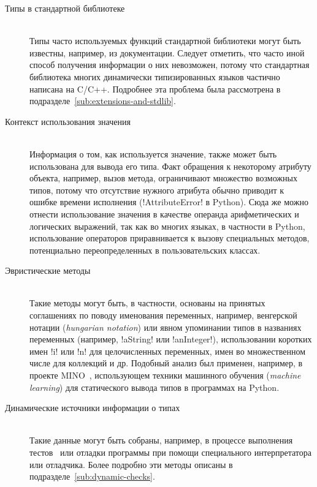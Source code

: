 \begin{description}
    \item[Типы в стандартной библиотеке] \hfill \\
        Типы часто используемых функций стандартной библиотеки могут быть
        известны, например, из документации. Следует отметить, что часто иной
        способ получения информации о них невозможен, потому что стандартная
        библиотека многих динамически типизированных языков частично написана на
        C/C++.  Подробнее эта проблема была рассмотрена в
        подразделе~\ref{sub:extensions-and-stdlib}.

    \item[Контекст использования значения] \hfill \\
        Информация о том, как используется значение, также может быть
        использована для вывода его типа. Факт обращения к некоторому атрибуту
        объекта, например, вызов метода, ограничивают множество возможных
        типов, потому что отсутствие нужного атрибута обычно приводит к ошибке
        времени исполнения (!AttributeError! в Python).  Сюда же можно отнести
        использование значения в качестве операнда арифметических и логических
        выражений, так как во многих языках, в частности в Python, использование
        операторов приравнивается к вызову специальных методов, потенциально
        переопределенных в пользовательских классах.

    \item[Эвристические методы] \hfill \\
        Такие методы могут быть, в частности, основаны на принятых соглашениях по
        поводу именования переменных, например, венгерской нотации
        (\emph{hungarian notation}) или явном упоминании типов в названиях
        переменных (например, !aString! или !anInteger!),
        использовании коротких имен !i! или !n!  для целочисленных переменных,
        имен во множественном числе для коллекций и др. Подобный анализ был
        применен, например, в проекте MINO~\cite[]{Tu}, использующем техники
        машинного обучения (\emph{machine learning}) для статического вывода
        типов в программах на Python.

    \item[Динамические источники информации о типах] \hfill \\
        Такие данные могут быть собраны, например, в процессе выполнения
        тестов~\cite{Haupt2011} или отладки программы при помощи специального
        интерпретатора или отладчика. Более подробно эти методы описаны в
        подразделе~\ref{sub:dynamic-checks}.


\end{description}
